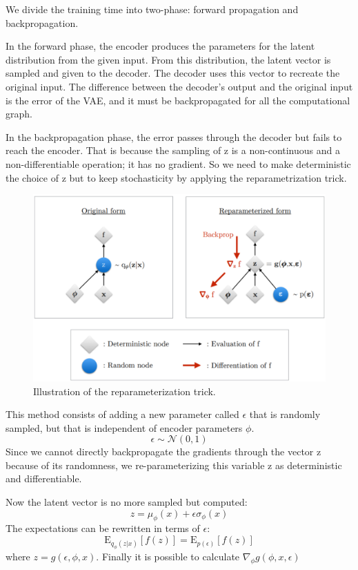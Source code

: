 We divide the training time into two-phase: forward propagation and backpropagation.

In the forward phase, the encoder produces the parameters for the latent distribution from the given input.
From this distribution, the latent vector is sampled and given to the decoder.
The decoder uses this vector to recreate the original input.
The difference between the decoder's output and the original input is the error of the VAE, and it must be backpropagated for all the computational graph.

In the backpropagation phase, the error passes through the decoder but fails to reach the encoder.
That is because the sampling of z is a non-continuous and a non-differentiable operation; it has no gradient.
So we need to make deterministic the choice of z but to keep stochasticity by applying the reparametrization trick.

\begin{figure}[h]
\centering
\label{reparameterization_trick}
     \includegraphics[width=1.0\textwidth]{pictures/reparameterization_trick}
      \caption{Illustration of the reparameterization trick.}
\end{figure}
This method consists of adding a new parameter called $\epsilon$  that is randomly sampled, but that is independent of encoder parameters $\phi$.
\begin{equation*}
\epsilon \sim \mathcal{N}(0,1)
\end{equation*}
Since we cannot directly backpropagate the gradients through the vector z because of its randomness, we re-parameterizing this variable z as deterministic and differentiable.

Now the latent vector is no more sampled but computed:
\begin{equation*}
z = \mu_\phi (x) + \epsilon\sigma_\phi(x)
\end{equation*}
The expectations can be rewritten in terms of $\epsilon$:
\begin{equation*}
\mathrm{E}_{q_\phi(z|x)}[f(z)] = \mathrm{E}_{p(\epsilon)}[f(z)]
\end{equation*}
where $z = g(\epsilon, \phi, x)$.
Finally it is possible to calculate $\nabla_\phi  g(\phi,x,\epsilon)$


